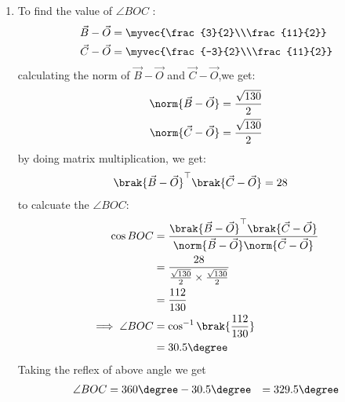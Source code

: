 \documentclass[11pt]{book}
\begin{document}
\begin{enumerate}[label=\thesection.\arabic*.,ref=\thesection.\theenumi]
\begin{enumerate}
\item To find  the value of $\angle{BOC}$ :
\begin{align}
\vec{B}-\vec{O}
          &= \myvec{\frac{3}{2}\\\frac{11}{2}}\\
\vec{C}-\vec{O}
          &= \myvec{\frac{-3}{2}\\\frac{11}{2}}
\end{align}
calculating the norm of $\vec{B}-\vec{O}$ and $\vec{C}-\vec{O}$,we get:
\begin{align}
	\norm{\vec{B}-\vec{O}} &= \frac{\sqrt{130}}{2}\\
	\norm{\vec{C}-\vec{O}} &= \frac{\sqrt{130}}{2}
\end{align}
by doing matrix multiplication, we get:
\begin{align}
\brak{\vec{B}-\vec{O}}^{\top}\brak{\vec{C}-\vec{O}} &= 28
\end{align}
to calcuate the $\angle{BOC}$:
\begin{align}
\cos{BOC} &= \frac{\brak{\vec{B}-\vec{O}}^{\top}\brak{\vec{C}-\vec{O}}}{\norm{\vec{B}-\vec{O}}\norm{\vec{C}-\vec{O}}}\\
&= \frac{28}{\frac{\sqrt{130}}{2}\times\frac{\sqrt{130}}{2}}\\
&= \frac{112}{130}\\
\implies\angle{BOC}&=\cos^{-1}\brak{\frac{112}{130}}\\
	&= 30.5\degree
\end{align}
Taking the reflex of above angle we get
		\begin{align}
			\angle{BOC} &= 360\degree - 30.5\degree
			&= 329.5\degree\label{eq:1}
		\end{align}


\end{enumerate}
\end{enumerate}
\end{document}
